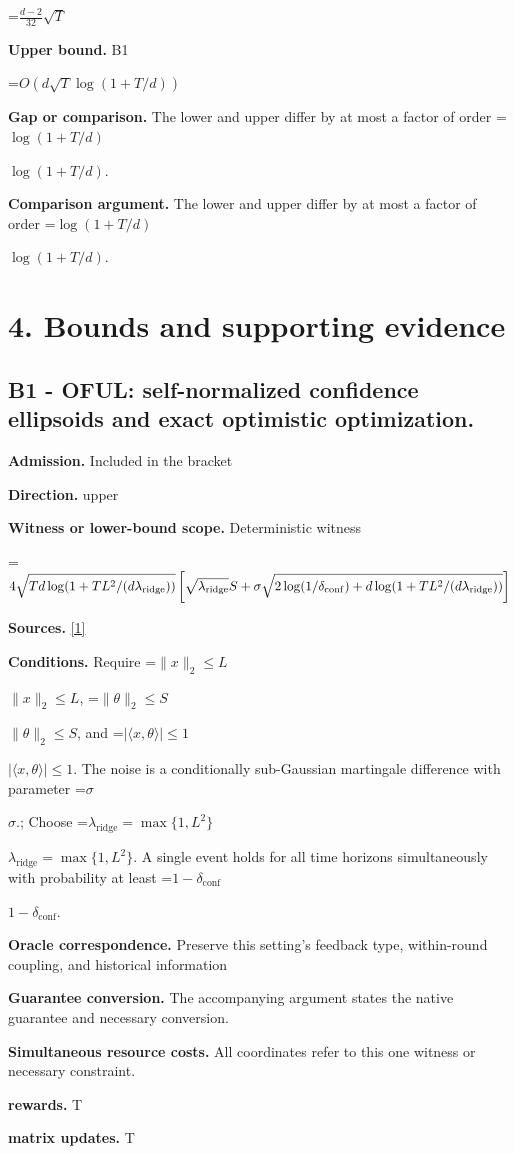 \documentclass[10pt,a4paper]{article}
\newcommand{\AtlasMath}[1]{\par\begingroup\centering\setbox0=\hbox{$\displaystyle #1$}\ifdim\wd0>1.4\linewidth\typeout{ATLAS WIDE FORMULA: \the\wd0}\fi\ifdim\wd0>\linewidth\resizebox{\linewidth}{!}{\box0}\else\box0\fi\par\endgroup}
\newcommand{\AtlasInlineMath}[1]{\begingroup\setbox0=\hbox{$#1$}\ifdim\wd0>.4\linewidth\endgroup\AtlasMath{#1}\else\endgroup$#1$\fi}
\begin{document}
\AtlasMath{\frac{d-2}{32}\sqrt T}
\textbf{Upper bound.} B1

\AtlasMath{O\!\left(d\sqrt T\log(1+T/d)\right)}
\textbf{Gap or comparison.} The lower and upper differ by at most a factor of order \AtlasInlineMath{\log(1+T/d)}.

\textbf{Comparison argument.} The lower and upper differ by at most a factor of order \AtlasInlineMath{\log(1+T/d)}.

\section{4. Bounds and supporting evidence}
\subsection{B1 - OFUL: self-normalized confidence ellipsoids and exact optimistic optimization.}
\textbf{Admission.} Included in the bracket

\textbf{Direction.} upper

\textbf{Witness or lower-bound scope.} Deterministic witness

\AtlasMath{4\sqrt{Td\log(1+TL^2/(d\lambda_{\rm ridge}))}\left[\sqrt{\lambda_{\rm ridge}}S+\sigma\sqrt{2\log(1/\delta_{\rm conf})+d\log(1+TL^2/(d\lambda_{\rm ridge}))}\right]}
\textbf{Sources.} \href{https://proceedings.neurips.cc/paper/2011/file/e1d5be1c7f2f456670de3d53c7b54f4a-Paper.pdf}{[1]}

\textbf{Conditions.} Require \AtlasInlineMath{\|x\|_2\le L}, \AtlasInlineMath{\|\theta\|_2\le S}, and \AtlasInlineMath{|\langle x,\theta\rangle|\le1}. The noise is a conditionally sub-Gaussian martingale difference with parameter \AtlasInlineMath{\sigma}.; Choose \AtlasInlineMath{\lambda_{\mathrm{ridge}}=\max\{1,L^2\}}. A single event holds for all time horizons simultaneously with probability at least \AtlasInlineMath{1-\delta_{\mathrm{conf}}}.

\textbf{Oracle correspondence.} Preserve this setting's feedback type, within-round coupling, and historical information

\textbf{Guarantee conversion.} The accompanying argument states the native guarantee and necessary conversion.

\textbf{Simultaneous resource costs.} All coordinates refer to this one witness or necessary constraint.

\textbf{rewards.} T

\textbf{matrix updates.} T
\end{document}

